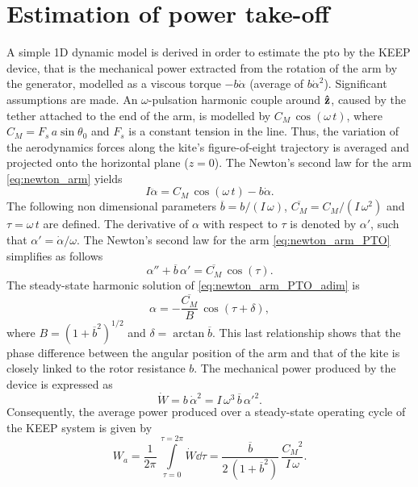 \section{Estimation of power take-off} \label{sec:1D-PTO}
A simple 1D dynamic model is derived in order to estimate the \ac{pto} by the KEEP device, that is the mechanical power extracted from the rotation of the arm by the generator, modelled as a viscous torque \(-b\dot\alpha\) (average of \(b\dot\alpha^2\)). Significant assumptions are made. An \(\omega\)-pulsation harmonic couple around \(\vu z\), caused by the tether attached to the end of the arm, is modelled by \(C_M\,\cos(\omega\,t)\), where \(C_M=F_s\,a \sin \theta_0\) and \(F_s\) is a constant tension in the line. Thus, the variation of the aerodynamics forces along the kite’s figure-of-eight trajectory is averaged and projected onto the horizontal plane (\(z=0\)). The Newton's second law for the arm \eqref{eq:newton_arm} yields
\begin{equation} \label{eq:newton_arm_PTO}
    I \ddot\alpha = C_M\,\cos(\omega\,t) -b \dot\alpha.
\end{equation}
The following non dimensional parameters \(\overline{b}=b/(I\,\omega)\), \(\overline{C_M}=C_M/(I\,\omega^2)\) and \(\tau=\omega\,t\) are defined. The derivative of \(\alpha\) with respect to \(\tau\) is denoted by \(\alpha'\), such that \(\alpha'=\dot{\alpha}/\omega\). The Newton's second law for the arm \eqref{eq:newton_arm_PTO} simplifies as follows
\begin{equation} \label{eq:newton_arm_PTO_adim}
    \alpha''+\overline{b}\, \alpha' = \overline{C_M}\,\cos(\tau).
\end{equation}
The steady-state harmonic solution of \eqref{eq:newton_arm_PTO_adim} is
\begin{equation} \label{eq:sol_alpha_PTO}
    \alpha = -\frac{\overline{C_M}}{B}\,\cos(\tau+\delta),
\end{equation}
where \(B=(1+\overline{b}^2)^{1/2}\) and \(\delta=\arctan \overline{b}\). This last relationship shows that the phase difference between the angular position of the arm and that of the kite is closely linked to the rotor resistance $b$. The mechanical power produced by the device is expressed as
\begin{equation} \label{eq:inst_power_PTO}
    \dot{W} = b \, \dot \alpha^2=I\,\omega^3\,\overline{b}\,\alpha'^2.
\end{equation}
Consequently, the average power produced over a steady-state operating cycle of the KEEP system is given by
\begin{equation} \label{eq:power_PTO}
    W_a =  \frac{1}{2\pi}\,\int \limits_{\tau=0}^{\tau=2\pi} \dot{W} \dd{\tau}=\frac{\overline{b}}{2\,\left(1+\overline{b}^2\right)}\, \frac{{C_M}^2}{I\,\omega}.
\end{equation}
